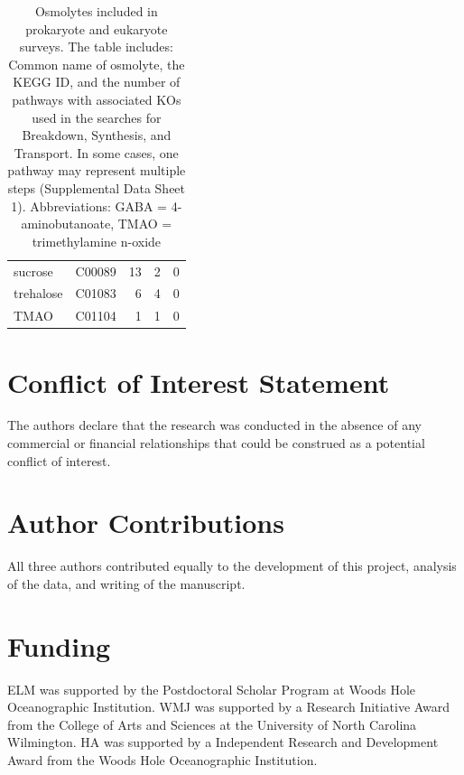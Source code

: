 \documentclass[utf8]{frontiersSCNS} %
\begin{document}
\begin{table}
\begin{tabular}{llrrr}
sucrose              & C00089           & 13                                     & 2                                      & 0                                      \\
trehalose            & C01083           & 6                                      & 4                                      & 0                                      \\
TMAO                 & C01104           & 1                                      & 1                                      & 0                                     
\end{tabular}
\caption{Osmolytes included in prokaryote and eukaryote surveys. The table includes: Common name of osmolyte, the KEGG ID, and the number of pathways with associated KOs used in the searches for Breakdown, Synthesis, and Transport. In some cases, one pathway may represent multiple steps (Supplemental Data Sheet 1). Abbreviations: GABA = 4-aminobutanoate, TMAO =  trimethylamine n-oxide}
\label{tabl:pathnum}
\end{table}
\egroup


\section*{Conflict of Interest Statement}

The authors declare that the research was conducted in the absence of any commercial or financial relationships that could be construed as a potential conflict of interest.

\section*{Author Contributions}
All three authors contributed equally to the development of this project, analysis of the data, and writing of the manuscript.

\section*{Funding}
ELM was supported by the Postdoctoral Scholar Program at Woods Hole Oceanographic Institution. WMJ was supported by a Research Initiative Award from the College of Arts and Sciences at the University of North Carolina Wilmington. HA was supported by a Independent Research and Development Award from the Woods Hole Oceanographic Institution. 
\end{document}
